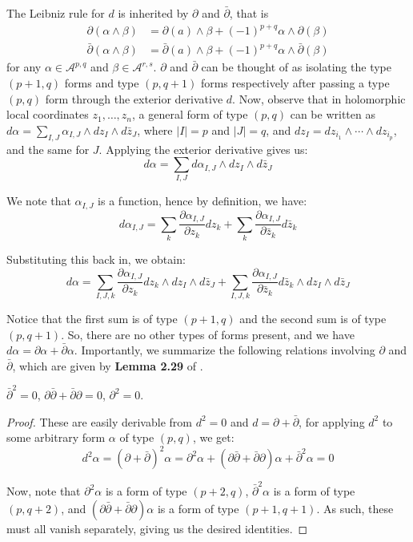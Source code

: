 \documentclass[11pt]{article}
\theoremstyle{definition}
\numberwithin{theorem}{section} %
\numberwithin{equation}{section} %
\begin{document}
\noindent The Leibniz rule for $d$ is inherited by $\partial$ and $\bar \partial$, that is
\begin{align*}
    \partial(\alpha \wedge \beta) &= \partial(a)\wedge \beta +(-1)^{p+q} \alpha\wedge \partial(\beta) \\
    \bar\partial(\alpha \wedge \beta) &= \bar\partial(a)\wedge \beta +(-1)^{p+q} \alpha\wedge \bar\partial(\beta)
\end{align*}
for any $\alpha\in \mathcal{A}^{p,q}$ and $\beta\in \mathcal{A}^{r,s}$. $\partial$ and $\bar\partial$ can be thought of as isolating the type $(p+1,q)$ forms and type $(p,q+1)$ forms respectively after passing a type $(p,q)$ form through the exterior derivative $d$. Now, observe that in holomorphic local coordinates $z_1,\ldots, z_n$, a general form of type $(p,q)$ can be written as $d\alpha = \sum_{I,J}\alpha_{I,J}\wedge dz_I \wedge d\bar z_J$, where $|I|=p$ and $|J|=q$, and $dz_I = dz_{i_1}\wedge \cdots \wedge dz_{i_p}$, and the same for $J$. Applying the exterior derivative gives us:
$$
d\alpha = \sum_{I,J}d\alpha_{I,J}\wedge dz_I \wedge d\bar z_J
$$

\noindent We note that $\alpha_{I,J}$ is a function, hence by definition, we have:
$$
d\alpha_{I,J} = \sum_{k}\frac{\partial \alpha_{I,J}}{\partial z_k}dz_k + \sum_{k} \frac{\partial\alpha_{I,J}}{\partial \bar z_k}d\bar z_k
$$

\noindent Substituting this back in, we obtain:
$$
d\alpha =\sum_{I,J,k}\frac{\partial \alpha_{I,J}}{\partial z_k}dz_k\wedge dz_I \wedge d\bar z_J + \sum_{I,J,k} \frac{\partial\alpha_{I,J}}{\partial \bar z_k}d\bar z_k \wedge dz_I \wedge d\bar z_J
$$

\noindent Notice that the first sum is of type $(p+1,q)$ and the second sum is of type $(p,q+1)$. So, there are no other types of forms present, and we have $d\alpha = \partial \alpha + \bar\partial \alpha$. Importantly, we summarize the following relations involving $\partial$ and $\bar \partial$, which are given by \textbf{Lemma 2.29} of \cite{VoisinI2002}.
\begin{lemma}
    $\bar\partial^2 =0$, $\partial\bar\partial + \bar\partial \partial =0$, $\partial^2=0$.
\end{lemma}
\begin{proof}
    These are easily derivable from $d^2=0$ and $d=\partial + \bar\partial$, for applying $d^2$ to some arbitrary form $\alpha$ of type $(p,q)$, we get:
$$
d^2\alpha = (\partial + \bar\partial)^2 \alpha = \partial^2 \alpha + (\partial\bar\partial + \bar\partial \partial)\alpha + \bar\partial^2 \alpha = 0
$$

\noindent Now, note that $\partial^2\alpha$ is a form of type $(p+2,q)$, $\bar\partial^2\alpha$ is a form of type $(p,q+2)$, and $(\partial\bar\partial + \bar\partial \partial)\alpha$ is a form of type $(p+1,q+1)$. As such, these must all vanish separately, giving us the desired identities. 
\end{proof}
\end{document}
